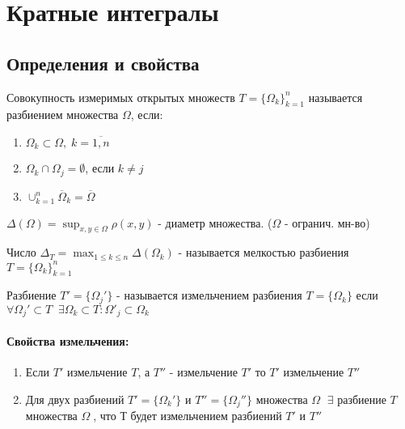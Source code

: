 \section{Кратные интегралы}\vspace{-10pt}
\subsection{Определения и свойства}
\setcounter{theorem}{0}
\begin{determenition}\vspace{-10pt}
	Совокупность измеримых открытых множеств $T=\{\Omega_k \}_{k=1}^n $ называется разбиением множества $\Omega$, если:
	\begin{enumerate}\vspace{-10pt}
		\item $\Omega_k\subset \Omega, \; k=\overline{1,n} $\vspace{-10pt}
		\item $\Omega_k\cap \Omega_j = \emptyset $, если $k\ne j $\vspace{-10pt}
		\item $\cup_{k=1}^n \overline{\Omega}_k = \overline{\Omega}$
	\end{enumerate}
\end{determenition}

\begin{determenition}\vspace{-10pt}
	$\Delta(\Omega)=\sup_{x,y\in \Omega}\rho(x,y)$ - диаметр множества. ($\Omega  $ - огранич. мн-во)
\end{determenition}

\begin{determenition}\vspace{-10pt}
	Число $\Delta_T=\max_{1\leq k \leq n} \Delta(\Omega_k) $ - называется  мелкостью разбиения $T=\{\Omega_k\}_{k=1}^n$ 
\end{determenition}

\begin{determenition}\vspace{-10pt}
	Разбиение $T'=\{\Omega_j'\} $ - называется измельчением разбиения $T=\{\Omega_k\}$ если $\forall \Omega_j'\subset T \;\; \exists \Omega_k\subset T: \Omega'_j\subset \Omega_k $
\end{determenition}

\paragraph{Свойства измельчения:}\vspace{-10pt}
\begin{enumerate}\vspace{-10pt}
	\item Если $T'$ измельчение $T$, а $T''$ - измельчение $T'$ то $T'$ измельчение $T''$\vspace{-10pt}
	\item Для двух разбиений $T'=\{\Omega_k'\}$ и $T''=\{\Omega_j''\}$ множества $\Omega \;$  $\exists $ разбиение $T $ множества $\Omega \;$, что Т будет измельчением разбиений $T'$ и $T''$
\end{enumerate}

